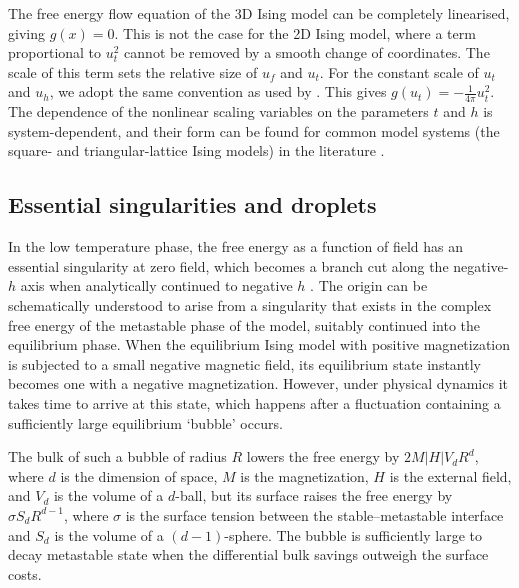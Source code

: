 \documentclass[
  aps,
  pre,
  reprint,
  longbibliography,
  floatfix
]{revtex4-2}
\begin{document}
The free energy flow equation of the 3D Ising model can be completely linearised, giving $g(x)=0$. This is not the case for the 2D Ising model, where a term proportional to $u_t^2$ cannot be removed by a smooth change of coordinates. The scale of this term sets the relative size of $u_f$ and $u_t$.
For the constant scale of $u_t$ and $u_h$, we adopt the same convention as used by
\cite{Fonseca_2003_Ising}. This gives $g(u_t)=-\frac1{4\pi}u_t^2$. The dependence of the nonlinear scaling variables on
the parameters $t$ and $h$ is system-dependent, and their form can be
found for common model systems (the square- and triangular-lattice Ising
models) in the literature \cite{Clement_2019_Respect}.



\subsection{Essential singularities and droplets}


In the low temperature phase, the free energy as a function of field has an essential singularity at zero field, which becomes a branch cut along the negative-$h$ axis when analytically continued to negative $h$ \cite{Langer_1967_Theory}. The origin can be schematically understood to arise from a
singularity that exists in the complex free energy of the metastable phase of
the model, suitably continued into the equilibrium phase. When the equilibrium
Ising model with positive magnetization is subjected to a small negative
magnetic field, its equilibrium state instantly becomes one with a negative
magnetization. However, under physical dynamics it takes time to arrive at this
state, which happens after a fluctuation containing a sufficiently large
equilibrium `bubble' occurs.

The bulk of such a bubble of radius $R$ lowers the free energy by
$2M|H|V_dR^d$, where $d$ is the dimension of space, $M$ is the magnetization,
$H$ is the external field, and $V_d$ is the volume of a $d$-ball, but its
surface raises the free energy by $\sigma S_dR^{d-1}$, where $\sigma$ is the
surface tension between the stable--metastable interface and $S_d$ is the
volume of a $(d-1)$-sphere. The bubble is sufficiently large to decay
metastable state when the differential bulk savings outweigh the surface costs.
\end{document}
